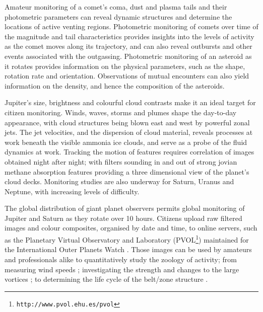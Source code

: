 \documentclass{ar2e}
\begin{document}
Amateur monitoring of a comet's coma, dust and plasma tails and their
photometric parameters can reveal dynamic structures and determine the locations
of active venting regions.  Photometric monitoring of comets over time of the
magnitude and tail characteristics provides insights into the levels of activity
as the comet moves along its trajectory, and can also reveal outbursts and other
events associated with the outgassing.  Photometric monitoring of an asteroid as
it rotates provides information on the physical parameters, such as the shape,
rotation rate and orientation.  Observations of mutual encounters can also yield
information on the density, and hence the composition of the asteroids.




Jupiter's size, brightness and colourful cloud contrasts make it an ideal target
for citizen monitoring.  Winds, waves, storms and plumes shape the day-to-day
appearance, with cloud structures being blown east and west by powerful zonal
jets.  The jet velocities, and the dispersion of cloud material, reveals
processes at work beneath the visible ammonia ice clouds, and serve as a probe
of the fluid dynamics at work.  Tracking the motion of features requires
correlation of images obtained night after night; with filters sounding in and
out of strong jovian methane absorption features providing a three dimensional
view of the planet's cloud decks.  Monitoring studies are also underway for
Saturn, Uranus and Neptune, with increasing levels of difficulty. 

The global distribution of giant planet observers permits global monitoring of
Jupiter and Saturn as they rotate over 10 hours. Citizens upload raw filtered
images and colour composites, organised by date and time, to online servers,
such as the Planetary Virtual Observatory and Laboratory
(PVOL\footnote{\texttt{http://www.pvol.ehu.es/pvol}}) maintained for the
International Outer Planets Watch \citep[IOPW][]{10hueso}.  Those images can be
used by amateurs and professionals alike to quantitatively study the zoology of
activity; from measuring wind speeds \citep{08sanchez}; investigating the
strength and changes to the large vortices \citep[e.g., the 2006 reddening of
Oval BA,][]{06simon-miller}; to determining the life cycle of the belt/zone
structure \citep{96sanchez, 11fletcher}. 
\end{document}
